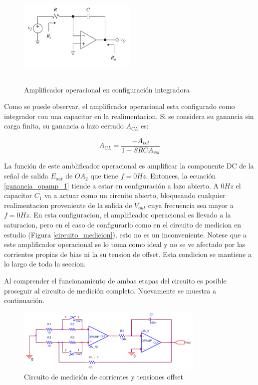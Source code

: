 \begin{figure}[ht]                                                       
    \centering\includegraphics[width=0.5\textwidth, height=5cm]{../Ex3/Figuras/fig_4.png}
     \caption{Amplificador operacional en configuración integradora}
     \label{fig_4}
     \end{figure}


Como se puede observar, el amplificador operacional esta configurado como integrador con una capacitor en la realimentacion. Si se considera su ganancia sin carga finita, su ganancia a lazo cerrado $A_{CL}$ es:

\begin{equation} A_{CL}= \frac{-A_{vol}}{1+SRC A_{vol}}  \label{ganancia_opamp_1} \end{equation}

La función de este amblificador operacional es amplificar la componente DC de la señal de salida $E_{out}$ de $OA_2$ que tiene $f=0Hz$. Entonces, la ecuación 
\ref{ganancia_opamp_1} tiende a estar en configuración a lazo abierto. A $0Hz$ el capacitor $C_{1}$ va a actuar como un circuito abierto, bloqueando cualquier realimentacion
proveniente de la salida de $V_{out}$ cuya frecuencia sea mayor a $f=0Hz$. En esta configuracion, el amplificador operacional es llevado a la saturacion, pero en el caso de configurarlo como en el circuito de medicion en estudio (Figura \ref{circuito_medicion}), esto no es 
un inconveniente. Notese que a este amplificador operacional se lo toma como ideal y no se ve afectado por las corrientes propias de bias ni la su tension de offset. Esta condicion se mantiene a lo largo de toda la seccion. 

Al comprender el funcionamiento de ambas etapas del circuito es posible proseguir al circuito de medición completo. Nuevamente se muestra a continuación.

\begin{figure}[ht]                                                       
    \centering\includegraphics[width=0.8\textwidth]{../Ex3/Figuras/circuito_medicion.png}
     \caption{Circuito de medición de corrientes y tensiones offset}
     \end{figure}

